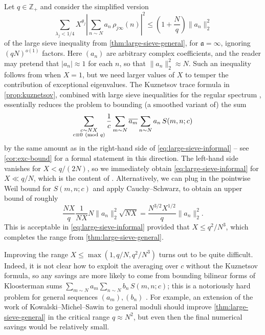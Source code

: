 \documentclass[reqno,11pt]{amsart}
\theoremstyle{remark}
\numberwithin{equation}{section}
\newcommand{\Z}{\mathbb{Z}}
\newcommand{\ma}{\mathfrak{a}}
\renewcommand{\bar}{\overline}
\renewcommand{\pmod}[1]{\ (\textnormal{mod } #1)}
\begin{document}
Let $q \in \Z_+$ and consider the simplified version
\begin{equation} \label{eq:large-sieve-informal}
    \sum_{\lambda_j < 1/4} X^{\theta_j} \left\vert \sum_{n \sim N} a_n\, \rho_{j\infty}(n) \right\vert^2 \le \left(1 + \frac{N}{q}\right) \|a_n\|_2^2
\end{equation}
of the large sieve inequality from \cref{thm:large-sieve-general}, for $\ma = \infty$, ignoring $(qN)^{o(1)}$ factors. Here $(a_n)$ are arbitrary complex coefficients, and the reader may pretend that $|a_n| \approx 1$ for each $n$, so that $\|a_n\|_2^2 \approx N$. Such an inequality follows from \cite[Theorem 2]{deshouillers1982kloosterman} when $X = 1$, but we need larger values of $X$ to temper the contribution of exceptional eigenvalues. The Kuznetsov trace formula \cite{kuznetsov1980petersson} in \cref{prop:kuznetsov}, combined with large sieve inequalities for the regular spectrum \cite[Theorem 2]{deshouillers1982kloosterman}, essentially reduces the problem to bounding (a smoothed variant of) the sum
\begin{equation} \label{eq:kloosterman-informal}
    \sum_{\substack{c \sim NX \\ c \equiv 0 \pmod{q}}} \frac{1}{c} \sum_{m \sim N} \bar{a_m} \sum_{n \sim N} a_n\, S(m, n; c)
\end{equation}
by the same amount as in the right-hand side of \cref{eq:large-sieve-informal} -- see \cref{cor:exc-bound} for a formal statement in this direction. The left-hand side vanishes for $X < q/(2N)$, so we immediately obtain \cref{eq:large-sieve-informal} for $X \ll q/N$, which is the content of \cite[Theorem 5]{deshouillers1982kloosterman}. Alternatively, we can plug in the pointwise Weil bound for $S(m, n; c)$ and apply Cauchy--Schwarz, to obtain an upper bound of roughly
\begin{equation} \label{eq:sqrt-growth-weil}
    \frac{NX}{q} \frac{1}{NX} N \|a_n\|_2^2 \sqrt{NX} =
    \frac{N^{3/2} X^{1/2}}{q} \|a_n\|_2^2.
\end{equation}
This is acceptable in \cref{eq:large-sieve-informal} provided that $X \le q^2/N^3$, which completes the range from \cref{thm:large-sieve-general}. 

Improving the range $X \le \max(1, q/N, q^2/N^3)$ turns out to be quite difficult. Indeed, it is not clear how to exploit the averaging over $c$ without the Kuznetsov formula, so any savings are more likely to come from bounding bilinear forms of Kloosterman sums $\sum_{m \sim N} a_m \sum_{n \sim N} b_n\, S(m, n; c)$; this is a notoriously hard problem for general sequences $(a_m), (b_n)$ \cite{kowalski2017bilinear,kowalski2020stratification,kerr2023bounds,xi2018ternary}. For example, an extension of the work of Kowalski--Michel--Sawin \cite{kowalski2017bilinear} to general moduli should improve \cref{thm:large-sieve-general} in the critical range $q \approx N^2$, but even then the final numerical savings would be relatively small.
\end{document}
